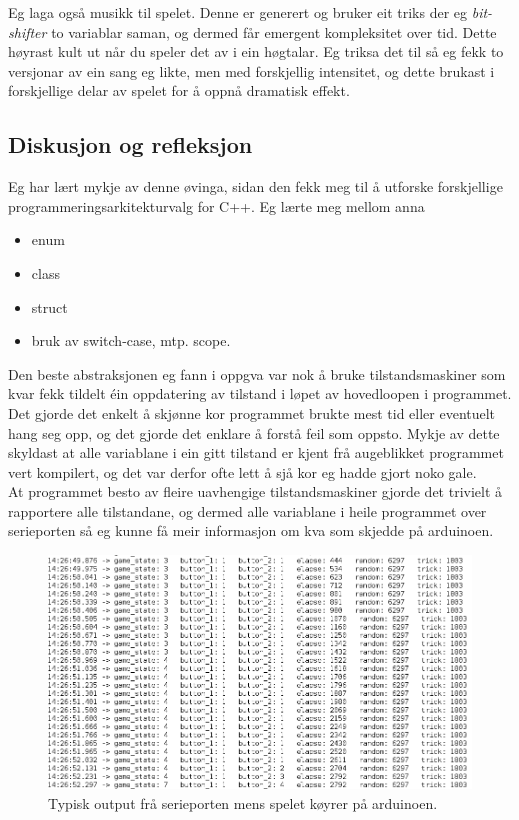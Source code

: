 \documentclass[journal]{IEEEtran}
\begin{document}
  Eg laga også musikk til spelet. Denne er generert og bruker eit triks der eg 
  \textit{bit-shifter} to variablar saman, og dermed får emergent kompleksitet
  over tid. Dette høyrast kult ut når du speler det av i ein høgtalar. Eg triksa
  det til så eg fekk to versjonar av ein sang eg likte, men med forskjellig intensitet,
  og dette brukast i forskjellige delar av spelet for å oppnå dramatisk effekt.



  \subsection{Diskusjon og refleksjon}
  Eg har lært mykje av denne øvinga, sidan den fekk meg til å utforske forskjellige
  programmeringsarkitekturvalg for C++. Eg lærte meg mellom anna
  \begin{itemize}
    \item enum
    \item class
    \item struct
    \item bruk av switch-case, mtp. scope.
  \end{itemize}
  Den beste abstraksjonen eg fann i oppgva var nok å bruke tilstandsmaskiner
  som kvar fekk tildelt éin oppdatering av tilstand i løpet av hovedloopen i
  programmet.  Det gjorde det enkelt å skjønne kor programmet brukte mest tid
  eller eventuelt hang seg opp, og det gjorde det enklare å forstå feil som
  oppsto.  Mykje av dette skyldast at alle variablane i ein gitt tilstand er
  kjent frå augeblikket programmet vert kompilert, og det var derfor ofte lett
  å sjå kor eg hadde gjort noko gale. \\

  At programmet besto av fleire uavhengige tilstandsmaskiner gjorde det trivielt
  å rapportere alle tilstandane, og dermed alle variablane i heile programmet
  over serieporten så eg kunne få meir informasjon om kva som skjedde på arduinoen.
  \begin{figure}[!h]
    \begin{center}
      \includegraphics[scale=0.2]{03_serial}
      \caption{Typisk output frå serieporten mens spelet køyrer på arduinoen.}
    \end{center}
  \end{figure}
\end{document}
